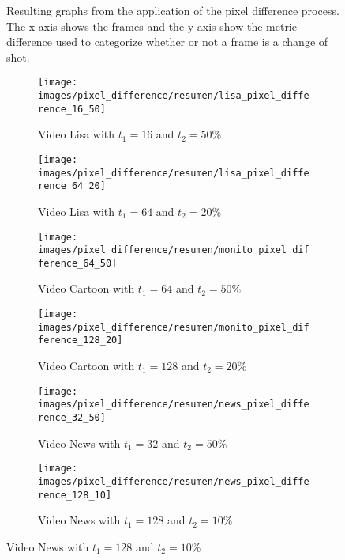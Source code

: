 \documentclass[journal]{IEEEtran}
\begin{document}
\begin{figure}
	\caption{Resulting graphs from the application of the pixel difference process. The x axis shows the frames and the y axis show the metric difference used to categorize whether or not a frame is a change of shot.}
	\label{fig:pixel_difference:graph}
\end{figure}


\begin{figure}
	\centering
	\begin{subfigure}{0.23\textwidth}
		\centering
		\texttt{[image: images/pixel\_difference/resumen/lisa\_pixel\_difference\_16\_50]} 
		\caption{Video Lisa with $t_1 = 16$ and $t_2 = 50\%$}
		\label{fig:pixel_difference:resumen:lisa_16_50} 
	\end{subfigure}
	\centering
	\begin{subfigure}{0.23\textwidth}
		\centering
		\texttt{[image: images/pixel\_difference/resumen/lisa\_pixel\_difference\_64\_20]}
		\caption{Video Lisa with $t_1 = 64$ and $t_2 = 20\%$}
		\label{fig:pixel_difference:resumen:lisa_64_20}
	\end{subfigure}
	
	\centering
	\begin{subfigure}{0.23\textwidth}
		\centering
		\texttt{[image: images/pixel\_difference/resumen/monito\_pixel\_difference\_64\_50]} 
		\caption{Video Cartoon with $t_1 = 64$ and $t_2 = 50\%$}
		\label{fig:pixel_difference:resumen:cartoon_64_50} 
	\end{subfigure}
	\centering
	\begin{subfigure}{0.23\textwidth}
		\centering
		\texttt{[image: images/pixel\_difference/resumen/monito\_pixel\_difference\_128\_20]}
		\caption{Video Cartoon with $t_1 = 128$ and $t_2 = 20\%$}
		\label{fig:pixel_difference:resumen:cartoon_128_20}
	\end{subfigure}
	
	\centering
	\begin{subfigure}{0.23\textwidth}
		\centering
		\texttt{[image: images/pixel\_difference/resumen/news\_pixel\_difference\_32\_50]} 
		\caption{Video News with $t_1 = 32$ and $t_2 = 50\%$}
		\label{fig:pixel_difference:resumen:news_32_50} 
	\end{subfigure}
	\centering
	\begin{subfigure}{0.23\textwidth}
		\centering
		\texttt{[image: images/pixel\_difference/resumen/news\_pixel\_difference\_128\_10]}
		\caption{Video News with $t_1 = 128$ and $t_2 = 10\%$}
		\label{fig:pixel_difference:resumen:news_128_10}
	\end{subfigure}
	

\end{figure}
\end{document}
